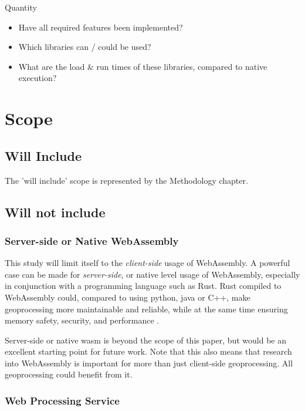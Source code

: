 Quantity
\begin{itemize}
    \item Have all required features been implemented?
    \item Which libraries can / could be used?
    \item What are the load \& run times of these libraries, compared to native execution?
\end{itemize} 

\newpage
\section{Scope}
\subsection*{Will Include}

The 'will include' scope is represented by the Methodology chapter. 


\subsection*{Will not include}

\subsubsection*{ Server-side or Native WebAssembly } %

This study will limit itself to the \emph{client-side} usage of WebAssembly. 
A powerful case can be made for \emph{server-side}, or native level usage of WebAssembly, especially in conjunction with a programming language such as Rust. 
Rust compiled to WebAssembly could, compared to using python, java or C++, make geoprocessing more maintainable and reliable, while at the same time ensuring memory safety, security, and performance \cite{clack_standardizing_2019}. 

Server-side or native wasm is beyond the scope of this paper, but would be an excellent starting point for future work. Note that this also means that research into WebAssembly is important for more than just client-side geoprocessing. All geoprocessing could benefit from it.



\subsubsection*{ Web Processing Service } %

